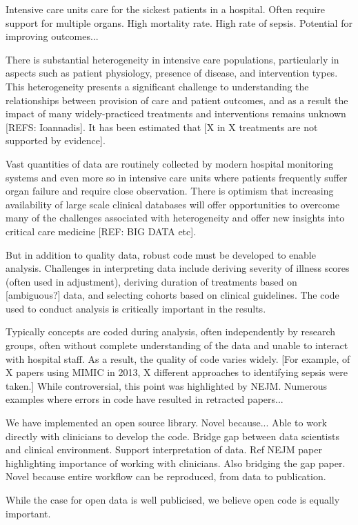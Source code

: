 \documentclass{elsart}
\begin{document}
Intensive care units care for the sickest patients in a hospital. Often require support for multiple organs. High mortality rate. High rate of sepsis. Potential for improving outcomes...

There is substantial heterogeneity in intensive care populations, particularly in aspects such as patient physiology, presence of disease, and intervention types. This heterogeneity presents a significant challenge to understanding the relationships between provision of care and patient outcomes, and as a result the impact of many widely-practiced treatments and interventions remains unknown [REFS: Ioannadis]. It has been estimated that [X in X treatments are not supported by evidence]. 

Vast quantities of data are routinely collected by modern hospital monitoring systems and even more so in intensive care units where patients frequently suffer organ failure and require close observation. There is optimism that increasing availability of large scale clinical databases will offer opportunities to overcome many of the challenges associated with heterogeneity and offer new insights into critical care medicine [REF: BIG DATA etc]. 

But in addition to quality data, robust code must be developed to enable analysis. Challenges in interpreting data include deriving severity of illness scores (often used in adjustment), deriving duration of treatments based on [ambiguous?] data, and selecting cohorts based on clinical guidelines. The code used to conduct analysis is critically important in the results.

Typically concepts are coded during analysis, often independently by research groups, often without complete understanding of the data and unable to interact with hospital staff. As a result, the quality of code varies widely. [For example, of X papers using MIMIC in 2013, X different approaches to identifying sepsis were taken.] While controversial, this point was highlighted by NEJM. Numerous examples where errors in code have resulted in retracted papers...

We have implemented an open source library. Novel because... Able to work directly with clinicians to develop the code. Bridge gap between data scientists and clinical environment. Support interpretation of data. Ref NEJM paper highlighting importance of working with clinicians. Also bridging the gap paper. Novel because entire workflow can be reproduced, from data to publication. 

While the case for open data is well publicised, we believe open code is equally important.
\end{document}
